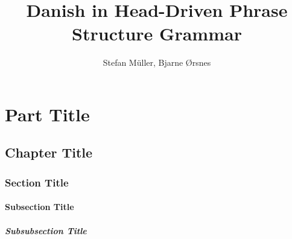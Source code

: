 \documentclass[ number=45
			   ,series=eotms
			   ,output=printondemand %
			  ]{langsci}
\title{Danish in \newlineCover Head-Driven \newlineCover\newlineSpine Phrase Structure \newlineCover Grammar  }
\author{Stefan Müller, \newlineCover Bjarne Ørsnes}
\begin{document}
               
        
                                    
                           
\maketitle                

\tableofcontents      
        
\part{Part Title}	               
\chapter{Chapter Title}
\section{Section Title}
\subsection{Subsection Title}
\subsubsection{Subsubsection Title}       
                                                   
         
\lipsum 
\lipsum[3-10]  

 

\newpage

\layout
                              
\end{document}
